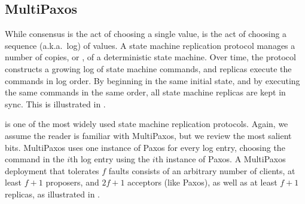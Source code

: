 
\subsection{MultiPaxos}
While consensus is the act of choosing a single value,  is the act of choosing a sequence (a.k.a.\ log) of values. A state
machine replication protocol manages a number of copies, or ,
of a deterministic state machine. Over time, the protocol constructs a growing
log of state machine commands, and replicas execute the commands in log
order.  By beginning in the same initial state, and by executing the same
commands in the same order, all state machine replicas are kept in sync. This
is illustrated in .

{}

 is one of the most widely used state machine replication
protocols. Again, we assume the reader is familiar with MultiPaxos, but we
review the most salient bits.
%
MultiPaxos uses one instance of Paxos for every log entry, choosing the command
in the $i$th log entry using the $i$th instance of Paxos.
%
A MultiPaxos deployment that tolerates $f$ faults consists of an arbitrary
number of clients, at least $f+1$ proposers, and $2f+1$ acceptors (like Paxos),
as well as at least $f+1$ replicas, as illustrated in
.

